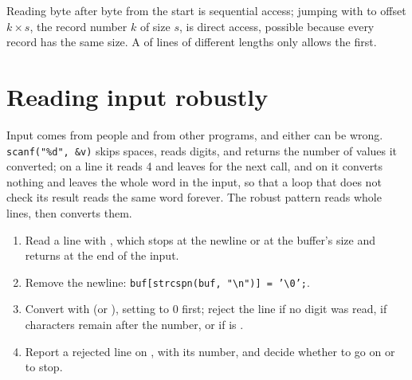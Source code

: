 Reading byte after byte from the start is sequential access; jumping with  to offset $k \times s$, the
record number $k$ of size $s$, is direct access, possible because every record has the same size. A  of lines
of different lengths only allows the first.

\section{Reading input robustly}\label{sec:b1:c-strings-structs-files:robust}

Input comes from people and from other programs, and either can be wrong. \texttt{scanf("\%d", \&v)} skips spaces,
reads digits, and returns the number of values it converted; on a line  it reads 4 and leaves  for
the next call, and on  it converts nothing and leaves the whole word in the input, so that a loop that
does not check its result reads the same word forever. The robust pattern reads whole lines, then converts them.

\begin{method}\label{met:b1:c-strings-structs-files:robust}
\begin{enumerate}
\item Read a line with , which stops at the newline or at the buffer's size and returns
 at the end of the input.
\item Remove the newline: \texttt{buf[strcspn(buf, \string"\textbackslash{}n\string")] = '\textbackslash{}0';}.
\item Convert with  (or ), setting  to 0 first; reject the line if no digit was
read, if characters remain after the number, or if  is .
\item Report a rejected line on , with its number, and decide whether to go on or to stop.
\end{enumerate}
\end{method}

\label{lst:b1:c-strings-structs-files:read}

\label{out:b1:c-strings-structs-files:read}

